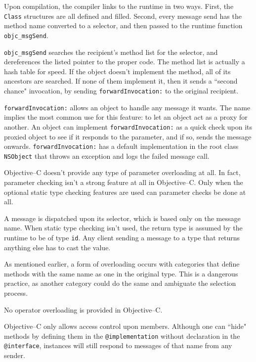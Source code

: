 	Upon compilation, the compiler links to the runtime in two ways.  First, the \texttt{Class} structures are all defined and filled. Second, every message send has the method name converted to a selector, and then passed to the runtime function \texttt{objc\_msgSend}.  

	\texttt{objc\_msgSend} searches the recipient's method list for the selector, and dereferences the listed pointer to the proper code.  The method list is actually a hash table for speed.  If the object doesn't implement the method, all of its ancestors are searched.  If none of them implement it, then it sends a ``second chance" invocation, by sending \texttt{forwardInvocation:} to the original recipient.

	\texttt{forwardInvocation:} allows an object to handle any message it wants.  The name implies the most common use for this feature: to let an object act as a proxy for another.  An object can implement \texttt{forwardInvocation:} as a quick check upon its proxied object to see if it responds to the parameter, and if so, sends the message onwards.  \texttt{forwardInvocation:} has a default implementation in the root class \texttt{NSObject} that throws an exception and logs the failed message call.

	Objective--C doesn't provide any type of parameter overloading at all.  In fact, parameter checking isn't a strong feature at all in Objective--C.  Only when the optional static type checking features are used can parameter checks be done at all.

	A message is dispatched upon its selector, which is based only on the message name.  When static type checking isn't used, the return type is assumed by the runtime to be of type \texttt{id}.  Any client sending a message to a type that returns anything else has to cast the value.

	As mentioned earlier, a form of overloading occurs with categories that define methods with the same name as one in the original type.  This is a dangerous practice, as another category could do the same and ambiguate the selection process.

	No operator overloading is provided in Objective--C.
	
	Objective--C only allows access control upon members.  Although one can ``hide" methods by defining them in the \texttt{@implementation} without declaration in the \texttt{@interface}, instances will still respond to messages of that name from any sender.

